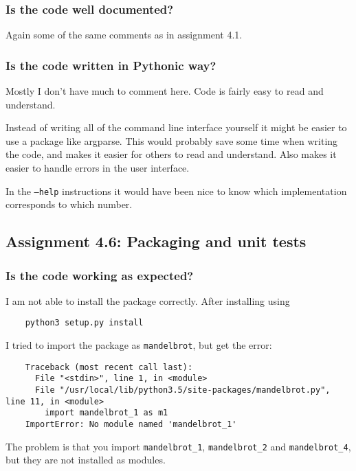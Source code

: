 \documentclass[a4paper]{article}
\begin{document}
\subsubsection*{Is the code well documented?}
Again some of the same comments as in assignment 4.1.

\subsubsection*{Is the code written in Pythonic way?}
Mostly I don't have much to comment here. Code is fairly easy to read and understand.

Instead of writing all of the command line interface yourself it might be easier to use a package like argparse. This would probably save some time when writing the code, and makes it easier for others to read and understand. Also makes it easier to handle errors in the user interface.

In the \texttt{--help} instructions it would have been nice to know which implementation corresponds to which number.


\subsection*{Assignment 4.6:  Packaging and unit tests}

\subsubsection*{Is the code working as expected?}

I am not able to install the package correctly. After installing using

\begin{verbatim}
    python3 setup.py install
\end{verbatim}

I tried to import the package as \texttt{mandelbrot}, but get the error:

\begin{verbatim}
    Traceback (most recent call last):
      File "<stdin>", line 1, in <module>
      File "/usr/local/lib/python3.5/site-packages/mandelbrot.py", line 11, in <module>
        import mandelbrot_1 as m1
    ImportError: No module named 'mandelbrot_1'
\end{verbatim}

The problem is that you import \texttt{mandelbrot\_1}, \texttt{mandelbrot\_2} and \texttt{mandelbrot\_4}, but they are not installed as modules.
\end{document}

